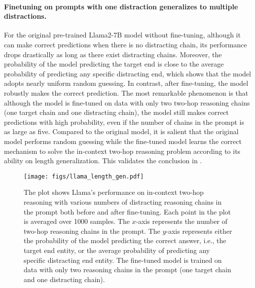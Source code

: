 \paragraph{Finetuning on prompts with one distraction generalizes to multiple distractions.}
For the original pre-trained Llama2-7B model without fine-tuning, although it can make correct predictions when there is no distracting chain, its performance drops drastically as long as there exist distracting chains. Moreover, the probability of the model predicting the target end is close to the average probability of predicting any specific distracting end, which shows that the model adopts nearly uniform random guessing.
In contrast, after fine-tuning, the model robustly makes the correct prediction. The most remarkable phenomenon is that although the model is fine-tuned on data with only two two-hop reasoning chains (one target chain and one distracting chain), the model still makes correct predictions with high probability, even if the number of chains in the prompt is as large as five. Compared to the original model, it is salient that the original model performs random guessing while the fine-tuned model learns the correct mechanism to solve the in-context two-hop reasoning problem according to its ability on length generalization. This validates the conclusion in .

\begin{figure}[h]
    \centering
    \texttt{[image: figs/llama\_length\_gen.pdf]}
    \caption{The plot shows Llama's performance on in-context two-hop reasoning with various numbers of distracting reasoning chains in the prompt both before and after fine-tuning. Each point in the plot is averaged over 1000 samples. The $x$-axis represents the number of two-hop reasoning chains in the prompt. The $y$-axis represents either the probability of the model predicting the correct answer, i.e., the target end entity, or the average probability of predicting any specific distracting end entity. The fine-tuned model is trained on data with only two reasoning chains in the prompt (one target chain and one distracting chain).}
    \label{fig:llm-length-gen}
\end{figure}